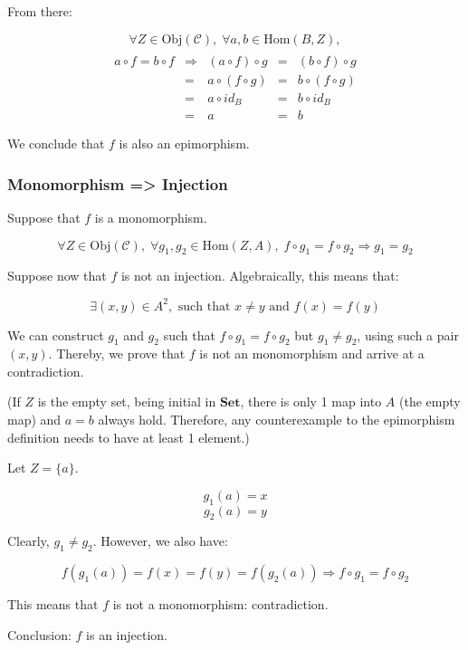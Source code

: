 \documentclass[12pt, letterpaper, twoside]{report}
\begin{document}
From there:

$$
\forall Z \in \text{Obj}(\mathcal{C}), \;
\forall a, b \in \text{Hom}(B, Z),
$$
$$
\begin{array}{ccccc} \\
a \circ f = b \circ f & \Rightarrow & (a \circ  f) \circ g  &=& (b \circ  f) \circ g  \\
                      & =           &  a \circ (f  \circ g) &=&  b \circ (f  \circ g) \\
                      & =           &  a \circ  id_B        &=&  b \circ  id_B        \\
                      & =           &  a                    &=&  b
\end{array}
$$

We conclude that $f$ is also an epimorphism.


\subsubsection*{Monomorphism => Injection}

Suppose that $f$ is a monomorphism.

$$
\forall Z \in \text{Obj}(\mathcal{C}), \;
\forall g_1, g_2 \in \text{Hom}(Z, A), \;
f \circ g_1 = f \circ g_2 \Rightarrow g_1 = g_2
$$

Suppose now that $f$ is not an injection. Algebraically, this means that:

$$\exists (x, y) \in A^2, \text{ such that } x \neq y \text{ and } f(x) = f(y)$$

We can construct $g_1$ and $g_2$ such that $f \circ g_1 = f \circ g_2$ but $g_1 \neq g_2$, using such a pair $(x, y)$. Thereby, we prove that $f$ is not an monomorphism and arrive at a contradiction.

(If $Z$ is the empty set, being initial in $\mathbf{Set}$, there is only 1 map into $A$ (the empty map) and $a = b$ always hold. Therefore, any counterexample to the epimorphism definition needs to have at least 1 element.)

Let $Z = \{a\}$.

$$g_1(a) = x$$
$$g_2(a) = y$$

Clearly, $g_1 \neq g_2$. However, we also have:

$$
f(g_1(a)) = f(x) = f(y) = f(g_2(a)) \Rightarrow
f \circ g_1 = f \circ g_2
$$

This means that $f$ is not a monomorphism: contradiction.

Conclusion: $f$ is an injection.
\end{document}
